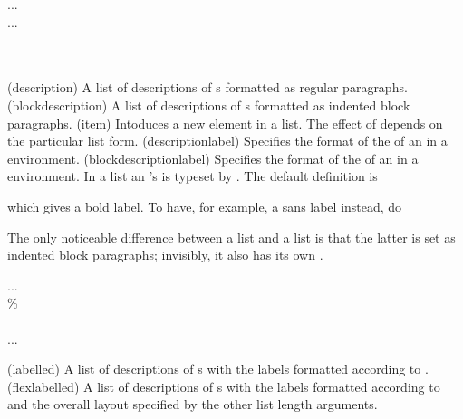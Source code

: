 \begin{syntax}
 \cmd{\item} ...  \\
 \cmd{\item} ...  \\
\cmd{\descriptionlabel} \\
\cmd{\blockdescriptionlabel} \\
\end{syntax}
\glossary(description)%
  {}%
  {A list of descriptions of s formatted as regular paragraphs.}
\glossary(blockdescription)%
  {}%
  {A list of descriptions of s formatted as indented block paragraphs.}
\glossary(item)%
  {}%
  {Intoduces a new element in a list. The effect of  depends
   on the particular list form.}
\glossary(descriptionlabel)%
  {}%
  {Specifies the format of the  of an  in a 
    environment.}
\glossary(blockdescriptionlabel)%
  {}%
  {Specifies the format of the  of an  in a 
    environment.}
In a  list an 's  is typeset by
. The default definition is
\begin{lcode}
\newcommand*{\descriptionlabel}[1]{\hspace\labelsep
                                   \normalfont\bfseries #1}
\end{lcode}
which gives a bold label. To have, for example, a sans label instead, do
\begin{lcode}
\renewcommand*{\descriptionlabel}[1]{\hspace\labelsep
                                     \normalfont\sffamily #1}
\end{lcode}

    The only noticeable difference between a  list and a 
 list is that the latter is set as indented block paragraphs;
invisibly, it also has its own \cmd{\blockdescriptionlabel}.

\begin{syntax}
 \cmd{\item} ...  \\
\% \\
                    \\
\cmd{\item} ...  \\
\end{syntax}
\glossary(labelled)%
  {}%
  {A list of descriptions of s with the labels formatted according to }.
\glossary(flexlabelled)%
  {}%
  {A list of descriptions of s with the labels formatted according to 
   and the overall layout specified by the other list length arguments.}


